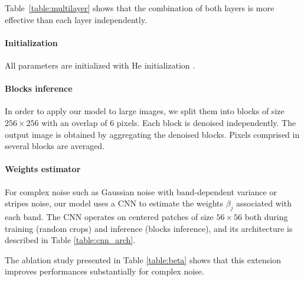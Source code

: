 Table~\ref{table:multilayer} shows that the combination of both layers is more effective than each layer independently.

\paragraph{Initialization}
All parameters are initialized with He initialization \cite{he_delving_2015}.

\paragraph{Blocks inference}
In order to apply our model to large images, we split them into blocks of size $256 \times 256$ with an overlap of 6 pixels.
Each block is denoised independently.
The output image is obtained by aggregating the denoised blocks.
Pixels comprised in several blocks are averaged.

\paragraph{Weights estimator}
For complex noise such as Gaussian noise with band-dependent variance or stripes noise, our model uses a CNN to estimate the weights $\beta_j$ associated with each band.
The CNN operates on centered patches of size $56 \times 56$ both during training (random crops) and inference (blocks inference), and its architecture is described in Table \ref{table:cnn_arch}.

\begin{table}[H]
	\centering
	\label{table:cnn_arch}
\end{table}
The ablation study presented in Table \ref{table:beta} shows that this extension improves performances substantially for complex noise.

